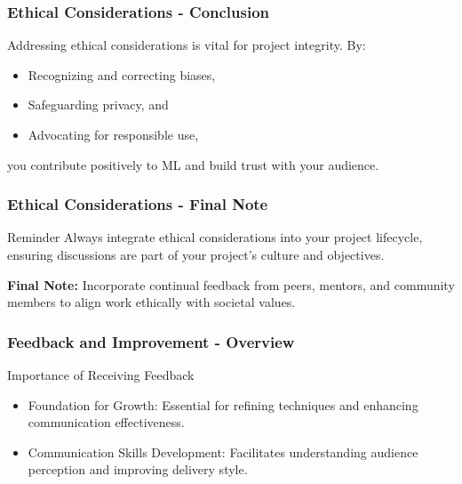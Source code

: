 \documentclass[aspectratio=169]{beamer}
\begin{document}
\begin{frame}[fragile]
    \frametitle{Ethical Considerations - Conclusion}
    Addressing ethical considerations is vital for project integrity. By:
    \begin{itemize}
        \item Recognizing and correcting biases,
        \item Safeguarding privacy, and
        \item Advocating for responsible use,
    \end{itemize}
    you contribute positively to ML and build trust with your audience.
\end{frame}

\begin{frame}[fragile]
    \frametitle{Ethical Considerations - Final Note}
    \begin{block}{Reminder}
        Always integrate ethical considerations into your project lifecycle, ensuring discussions are part of your project's culture and objectives.
    \end{block}

    \textbf{Final Note:} Incorporate continual feedback from peers, mentors, and community members to align work ethically with societal values.
\end{frame}

\begin{frame}[fragile]
    \frametitle{Feedback and Improvement - Overview}
    \begin{block}{Importance of Receiving Feedback}
        \begin{itemize}
            \item Foundation for Growth: Essential for refining techniques and enhancing communication effectiveness.
            \item Communication Skills Development: Facilitates understanding audience perception and improving delivery style.
        \end{itemize}
    \end{block}
\end{frame}
\end{document}
